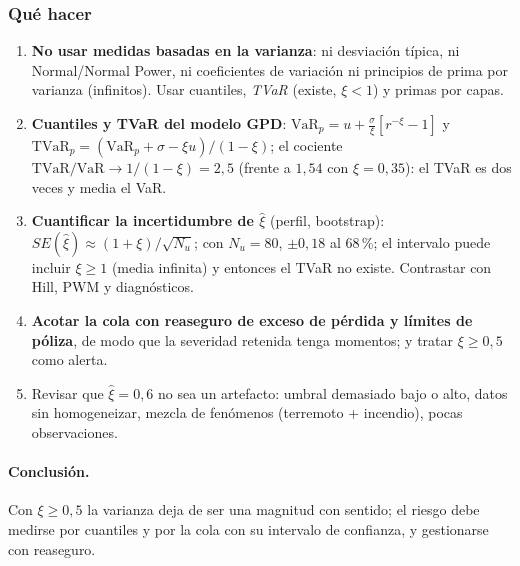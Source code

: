 \documentclass[a4paper,12pt]{article}
\newcommand{\VaR}{\mathrm{VaR}}
\newcommand{\TVaR}{\mathrm{TVaR}}
\begin{document}
\subsubsection*{Qu\'e hacer}
\begin{enumerate}[leftmargin=*,itemsep=2pt]
\item \textbf{No usar medidas basadas en la varianza}: ni desviaci\'on t\'ipica, ni Normal/Normal Power, ni coeficientes de variaci\'on ni principios de prima por varianza (infinitos). Usar cuantiles, \emph{TVaR} (existe, $\xi<1$) y primas por capas.
\item \textbf{Cuantiles y TVaR del modelo GPD}: $\VaR_p=u+\frac\sigma\xi[r^{-\xi}-1]$ y $\TVaR_p=(\VaR_p+\sigma-\xi u)/(1-\xi)$; el cociente $\TVaR/\VaR\to1/(1-\xi)=2{,}5$ (frente a $1{,}54$ con $\xi=0{,}35$): el TVaR es dos veces y media el VaR.
\item \textbf{Cuantificar la incertidumbre de $\hat\xi$} (perfil, bootstrap): $SE(\hat\xi)\approx(1+\xi)/\sqrt{N_u}$; con $N_u=80$, $\pm0{,}18$ al 68\,\%; el intervalo puede incluir $\xi\ge1$ (media infinita) y entonces el TVaR no existe. Contrastar con Hill, PWM y diagn\'osticos.
\item \textbf{Acotar la cola con reaseguro de exceso de p\'erdida y l\'imites de p\'oliza}, de modo que la severidad retenida tenga momentos; y tratar $\xi\ge0{,}5$ como alerta.
\item Revisar que $\hat\xi=0{,}6$ no sea un artefacto: umbral demasiado bajo o alto, datos sin homogeneizar, mezcla de fen\'omenos (terremoto + incendio), pocas observaciones.
\end{enumerate}

\paragraph{Conclusi\'on.} Con $\xi\ge0{,}5$ la varianza deja de ser una magnitud con sentido; el riesgo debe medirse por cuantiles y por la cola con su intervalo de confianza, y gestionarse con reaseguro.
\end{document}
